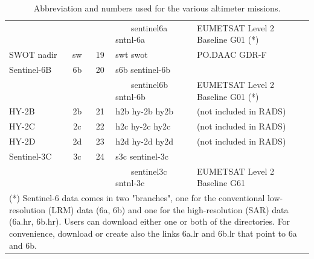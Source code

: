 \begin{table}
\begin{tabular}{lccll}
            &    &    & ~~~ sentinel6a sntnl-6a & EUMETSAT Level 2 Baseline G01 (*) \\
SWOT nadir  & sw & 19 & swt swot                & PO.DAAC GDR-F \\
Sentinel-6B & 6b & 20 & s6b sentinel-6b    &  \\
            &    &    & ~~~ sentinel6b sntnl-6b & EUMETSAT Level 2 Baseline G01 (*) \\
HY-2B       & 2b & 21 & h2b hy-2b hy2b          & (not included in RADS) \\
HY-2C       & 2c & 22 & h2c hy-2c hy2c          & (not included in RADS) \\
HY-2D       & 2d & 23 & h2d hy-2d hy2d          & (not included in RADS) \\
Sentinel-3C & 3c & 24 & s3c sentinel-3c         &  \\
            &    &    & ~~~ sentinel3c sntnl-3c & EUMETSAT Level 2 Baseline G61 \\
\hline
\multicolumn{5}{p{15cm}}{
(*) Sentinel-6 data comes in two "branches", one for the conventional low-resolution (LRM) data (6a, 6b) and one for the high-resolution (SAR) data (6a.hr, 6b.hr). Users can download either one or both of the directories. For convenience, download or create also the links 6a.lr and 6b.lr that point to 6a and 6b.} \\
\hline
\end{tabular}
\caption{Abbreviation and numbers used for the various altimeter missions.}
\label{tab:rads4_sats}
\end{table}
